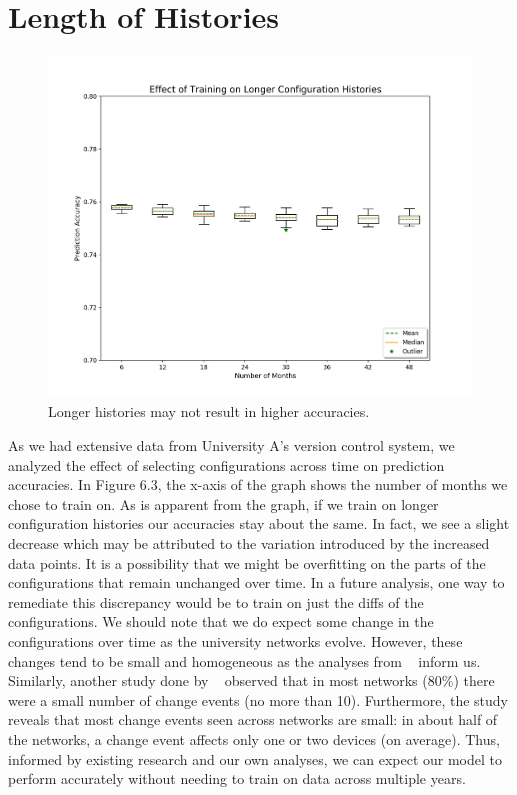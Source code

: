 \documentclass[../thesis.tex]{subfiles}
\begin{document}
\section{Length of Histories}

\begin{figure}[H]
	\centering
	\includegraphics[width=\textwidth]{time.png}
	\caption{Longer histories may not result in higher accuracies.}
\end{figure}

As we had extensive data from University A's version control system, we analyzed the effect of selecting configurations across time on prediction accuracies. In Figure 6.3, the x-axis of the graph shows the number of months we chose to train on. As is apparent from the graph, if we train on longer configuration histories our accuracies stay about the same. In fact, we see a slight decrease which may be attributed to the variation introduced by the increased data points. It is a possibility that we might be overfitting on the parts of the configurations that remain unchanged over time. In a future analysis, one way to remediate this discrepancy would be to train on just the diffs of the configurations.
We should note that we do expect some change in the configurations over time as the university networks evolve. However, these changes tend to be small and homogeneous as the analyses from ~\cite{Kim} inform us. Similarly, another study done by ~\cite{Gember} observed that in most networks (80\%) there were a small number of change events (no more than 10). Furthermore, the study reveals that most change events seen across networks are small: in about half of the networks, a change event affects only one or two devices (on average). Thus, informed by existing research and our own analyses, we can expect our model to perform accurately without needing to train on data across multiple years.
\end{document}
